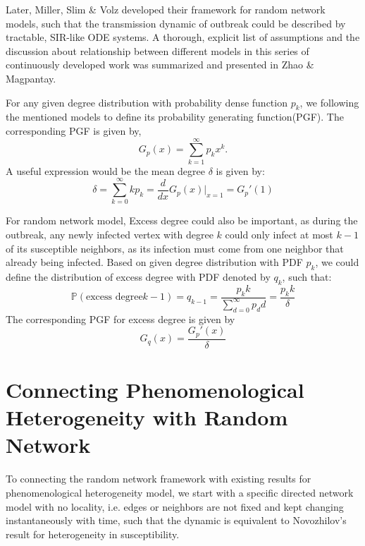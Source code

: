 \documentclass[12pt]{article}
\theoremstyle{plain}
\theoremstyle{definition}
\begin{document}
Later, Miller, Slim \& Volz\cite{MillerSlimVolz:2012} developed their framework for random network models, such that the transmission dynamic of outbreak could be described by tractable, SIR-like ODE systems.
A thorough, explicit list of assumptions and the discussion about relationship between different models in this series of continuously developed work was summarized and presented in Zhao \& Magpantay\cite{ZhaoMagpantay:2024}.

For any given degree distribution with probability dense function $p_k$, we following the mentioned models to define its probability generating function(PGF). 
The corresponding PGF is given by,
\begin{equation}
	\label{eqn: pgfgp}
	G_p(x)=\sum_{k=1}^\infty p_k x^k.
\end{equation}
A useful expression would be the mean degree $\delta$ is given by:
\begin{equation}
	\delta=\sum_{k=0}^{\infty}k p_k=\frac{d}{dx}G_p(x)|_{x=1}=G_p'(1)
\end{equation}

For random network model, Excess degree could also be important, as during the outbreak, any newly infected vertex with degree $k$ could only infect at most $k-1$ of its susceptible neighbors, as its infection must come from one neighbor that already being infected.
Based on given degree distribution with PDF $p_k$, we could define the distribution of excess degree with PDF denoted by $q_k$, such that:
\begin{equation}
	\mathbb{P}(\text{excess degree}k-1)=q_{k-1}=\frac{p_k k}{\sum_{d=0}^{\infty}p_d d}=\frac{p_k k}{\delta}
\end{equation}
The corresponding PGF for excess degree is given by
\begin{equation}
	G_q(x)=\frac{G_p'(x)}{\delta}
\end{equation}

\section{Connecting Phenomenological Heterogeneity with Random Network}
\label{sec: model}

To connecting the random network framework with existing results for phenomenological heterogeneity model, we start with a specific directed network model with no locality, i.e. edges or neighbors are not fixed and kept changing instantaneously with time, such that the dynamic is equivalent to Novozhilov's\cite{Novozhilov:2008} result for heterogeneity in susceptibility. 
\end{document}
